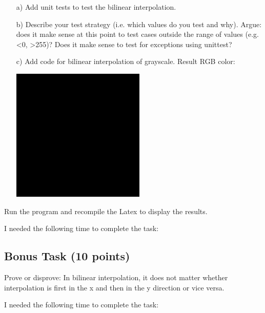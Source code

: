 \begin{enumerate}

\item[a)] Add unit tests to test the bilinear interpolation. 

\item[b)] Describe your test strategy (i.e. which values do you test and why). Argue: does it make sense at this point to test cases outside the range of values (e.g. <0, >255)? Does it make sense to test for exceptions using unittest?

\item[c)] Add code for bilinear interpolation of grayscale. 
Result RGB color:

\includegraphics[width=0.5\textwidth]{source_code/bilinear_interpolate_rgb.png}

\end{enumerate}

Run the program and recompile the Latex to display the results.

I needed the following time to complete the task:

\subsection{Bonus Task (10 points)}

Prove or disprove: In bilinear interpolation, it does not matter whether interpolation is first in the x and then in the y direction or vice versa.

I needed the following time to complete the task:

